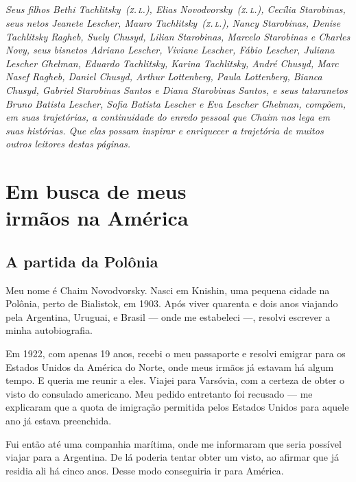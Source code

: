 \chapter*{}
\thispagestyle{empty}

\vfill
\begin{flushright}
\small
\textit{Seus filhos Bethi Tachlitsky~(\textsc{z.\,l.}), Elias Novodvorsky~(\textsc{z.\,l.}), Cecília Starobinas, seus netos Jeanete Lescher, Mauro Tachlitsky~(\textsc{z.\,l.}), Nancy Starobinas, Denise Tachlitsky Ragheb, Suely Chusyd, Lilian Starobinas, Marcelo Starobinas e Charles Novy, seus bisnetos Adriano Lescher, Viviane Lescher, Fábio Lescher, Juliana Lescher Ghelman, Eduardo Tachlitsky, Karina Tachlitsky, André Chusyd, Marc Nasef Ragheb, Daniel Chusyd, Arthur Lottenberg, Paula Lottenberg, Bianca Chusyd, Gabriel Starobinas Santos e Diana Starobinas Santos, e seus tataranetos Bruno Batista Lescher, Sofia Batista Lescher e Eva Lescher Ghelman, compõem, em suas trajetórias, a continuidade do enredo pessoal que Chaim nos lega em suas histórias. Que elas possam inspirar e enriquecer a trajetória de muitos outros leitores destas páginas.} 
\end{flushright}

\part[Em busca de meus irmãos na América]{Em busca de meus\\irmãos na América}
\chapter{A partida da Polônia}

Meu nome é Chaim Novodvorsky. Nasci em Knishin, uma pequena cidade na
Polônia, perto de Bialistok, em 1903. Após viver quarenta e dois anos viajando pela
Argentina, Uruguai, e Brasil --- onde me estabeleci ---, resolvi escrever a minha
autobiografia.


Em 1922, com apenas 19 anos, recebi o meu passaporte e resolvi emigrar
para os Estados Unidos da América do Norte, onde meus irmãos já estavam
há algum tempo. E queria me reunir a eles. Viajei para Varsóvia, com
a certeza de obter o visto do consulado americano. Meu pedido entretanto foi recusado --- me explicaram 
que a quota de imigração permitida pelos Estados Unidos para 
aquele ano já estava preenchida.

Fui então até uma companhia marítima, onde me informaram que seria possível
viajar para a Argentina. De lá poderia tentar obter um visto, ao afirmar que já residia ali há cinco anos. Desse modo conseguiria ir para América.

